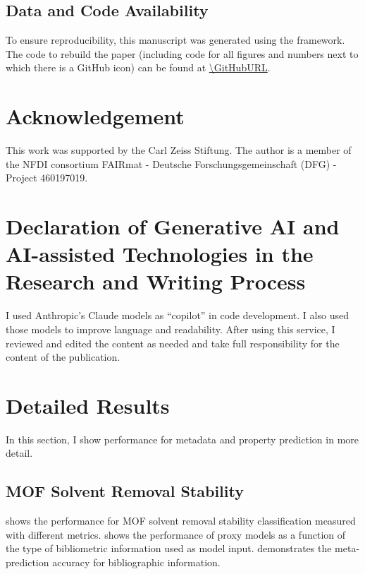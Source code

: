 \documentclass[11pt, oneside]{article}
\begin{document}
\subsection*{Data and Code Availability}

To ensure reproducibility, this manuscript was generated using the \href{https://show-your.work/en/latest/}{\showyourwork} framework.\autocite{Luger2021}
The code to rebuild the paper (including code for all figures and numbers next to which there is a GitHub icon) can be found at \url{\GitHubURL}.

\section*{Acknowledgement}
This work was supported by the Carl Zeiss Stiftung. The author is a member of the NFDI consortium FAIRmat - Deutsche Forschungsgemeinschaft (DFG) - Project 460197019.

\section*{Declaration of Generative AI and AI-assisted Technologies in the Research and Writing Process}
I used Anthropic's Claude models as \enquote{copilot} in code development. I also used those models to improve language and readability. After using this service, I reviewed and edited the content as needed and take full responsibility for the content of the publication.

\printbibliography

\pagebreak


\appendix

\section{Detailed Results}
In this section, I show performance for metadata and property prediction in more detail. 


\subsection{MOF Solvent Removal Stability}
 shows the performance for MOF solvent removal stability classification measured with different metrics. 
 shows the performance of proxy models as a function of the type of bibliometric information used as model input.
 demonstrates the meta-prediction accuracy for bibliographic information. 
\end{document}
